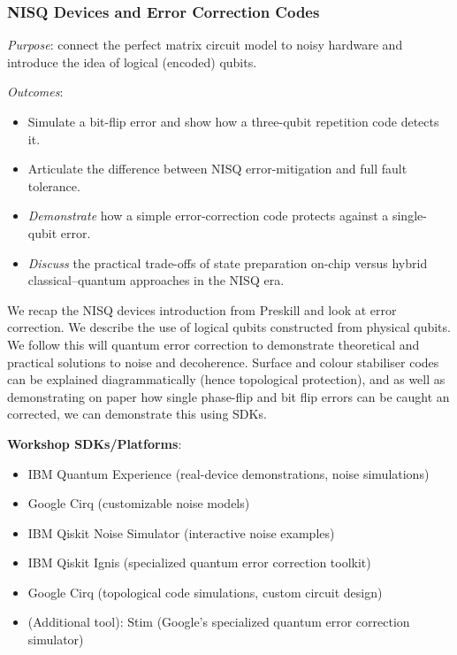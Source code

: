 \subsubsection*{NISQ Devices and Error Correction Codes}

\emph{Purpose}: connect the perfect matrix circuit model to noisy hardware and introduce the idea of logical (encoded) qubits.

\emph{Outcomes}:
\begin{itemize}
	\item Simulate a bit-flip error and show how a three-qubit repetition code detects it.
	\item Articulate the difference between NISQ error-mitigation and full fault tolerance.
	\item \emph{Demonstrate} how a simple error-correction code protects against a single-qubit error.	
	\item \emph{Discuss} the practical trade-offs of state preparation on-chip versus hybrid classical–quantum approaches in the NISQ era.
\end{itemize}


We recap the NISQ devices introduction from Preskill and look at error correction.
We describe the use of logical qubits constructed from physical qubits. 
We follow this will quantum error correction to demonstrate theoretical and practical solutions to noise and decoherence.
Surface and colour stabiliser codes can be explained diagrammatically (hence topological protection),
 and as well as demonstrating on paper how single phase-flip and bit flip errors can be caught an corrected, 
 we can demonstrate this using SDKs.

\textbf{Workshop SDKs/Platforms}:
\begin{itemize}
	\item IBM Quantum Experience (real-device demonstrations, noise simulations)
	\item Google Cirq (customizable noise models)
	\item IBM Qiskit Noise Simulator (interactive noise examples)
	\item IBM Qiskit Ignis (specialized quantum error correction toolkit)
	\item Google Cirq (topological code simulations, custom circuit design)
	\item (Additional tool): Stim (Google's specialized quantum error correction simulator)
\end{itemize}


